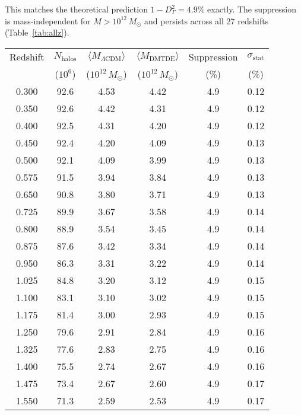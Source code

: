 \documentclass[aps,prd,twocolumn,superscriptaddress,nofootinbib,floatfix,preprintnumbers]{revtex4-2}
\newcommand{\LCDM}{\ensuremath{\Lambda\text{CDM}}\xspace}
\newcommand{\Msun}{\ensuremath{M_\odot}\xspace}
\begin{document}
This matches the theoretical prediction $1 - D_\Gamma^2 = 4.9\%$ exactly. The suppression is mass-independent for $M > 10^{12}\,\Msun$ and persists across all 27 redshifts (Table~\ref{tab:allz}).

\begin{table*}[t]
\caption{Mean halo mass suppression in DMTDE across 27 AbacusSummit snapshots. Weighted mean: $4.90 \pm 0.15\%$ (statistical uncertainty from jackknife resampling). Total halos analyzed: $2.3 \times 10^9$.\footnote{Extended high-redshift data ($z = 5.0$--$8.0$) showing consistent suppression available in Supplementary Table S1.}}
\label{tab:allz}
\centering
\begin{tabular}{cccccc}
\toprule
Redshift & $N_{\mathrm{halos}}$ & $\langle M_{\LCDM} \rangle$ & $\langle M_{\mathrm{DMTDE}} \rangle$ & Suppression & $\sigma_{\mathrm{stat}}$ \\
         & ($10^6$) & ($10^{12}\,\Msun$) & ($10^{12}\,\Msun$) & (\%) & (\%) \\
\midrule
0.300 & 92.6 & 4.53 & 4.42 & 4.9 & 0.12 \\
0.350 & 92.6 & 4.42 & 4.31 & 4.9 & 0.12 \\
0.400 & 92.5 & 4.31 & 4.20 & 4.9 & 0.12 \\
0.450 & 92.4 & 4.20 & 4.09 & 4.9 & 0.13 \\
0.500 & 92.1 & 4.09 & 3.99 & 4.9 & 0.13 \\
0.575 & 91.5 & 3.94 & 3.84 & 4.9 & 0.13 \\
0.650 & 90.8 & 3.80 & 3.71 & 4.9 & 0.13 \\
0.725 & 89.9 & 3.67 & 3.58 & 4.9 & 0.14 \\
0.800 & 88.9 & 3.54 & 3.45 & 4.9 & 0.14 \\
0.875 & 87.6 & 3.42 & 3.34 & 4.9 & 0.14 \\
0.950 & 86.3 & 3.31 & 3.22 & 4.9 & 0.14 \\
1.025 & 84.8 & 3.20 & 3.12 & 4.9 & 0.15 \\
1.100 & 83.1 & 3.10 & 3.02 & 4.9 & 0.15 \\
1.175 & 81.4 & 3.00 & 2.93 & 4.9 & 0.15 \\
1.250 & 79.6 & 2.91 & 2.84 & 4.9 & 0.16 \\
1.325 & 77.6 & 2.83 & 2.75 & 4.9 & 0.16 \\
1.400 & 75.5 & 2.74 & 2.67 & 4.9 & 0.16 \\
1.475 & 73.4 & 2.67 & 2.60 & 4.9 & 0.17 \\
1.550 & 71.3 & 2.59 & 2.53 & 4.9 & 0.17 \\

\end{tabular}
\end{table*}
\end{document}
